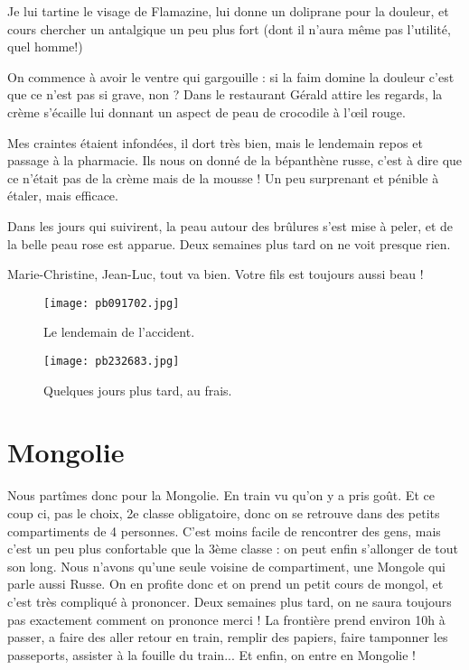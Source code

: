 \documentclass{book}
\begin{document}
Je lui tartine le visage de Flamazine, lui donne un doliprane pour la douleur, et cours chercher un antalgique un peu plus fort (dont il n'aura même pas l'utilité, quel homme!)

On commence à avoir le ventre qui gargouille : si la faim domine la douleur c'est que ce n'est pas si grave, non ? Dans le restaurant Gérald attire les regards, la crème s'écaille lui donnant un aspect de peau de crocodile à l’œil rouge.

Mes craintes étaient infondées, il dort très bien, mais le lendemain repos et passage à la pharmacie. Ils nous on donné de la bépanthène russe, c'est à dire que ce n'était pas de la crème mais de la mousse ! Un peu surprenant et pénible à étaler, mais efficace.

Dans les jours qui suivirent, la peau autour des brûlures s'est mise à peler, et de la belle peau rose est apparue. Deux semaines plus tard on ne voit presque rien.

Marie-Christine, Jean-Luc, tout va bien. Votre fils est toujours aussi beau !


\begin{figure}[h]
\centering
\texttt{[image: pb091702.jpg]}
\caption*{ Le lendemain de l'accident.}
\end{figure}


\begin{figure}[h]
\centering
\texttt{[image: pb232683.jpg]}
\caption*{ Quelques jours plus tard, au frais.}
\end{figure}

\chapter{Mongolie}
Nous partîmes donc pour la Mongolie. En train vu qu'on y a pris goût. Et ce coup ci, pas le choix, 2e classe obligatoire, donc on se retrouve dans des petits compartiments de 4 personnes. C'est moins facile de rencontrer des gens, mais c'est un peu plus confortable que la 3ème classe : on peut enfin s'allonger de tout son long. Nous n'avons qu'une seule voisine de compartiment, une Mongole qui parle aussi Russe. On en profite donc et on prend un petit cours de mongol, et c'est très compliqué à prononcer. Deux semaines plus tard, on ne saura toujours pas exactement comment on prononce merci !
La frontière prend environ 10h à passer, a faire des aller retour en train, remplir des papiers, faire tamponner les passeports, assister à la fouille du train... Et enfin, on entre en Mongolie !
\end{document}
